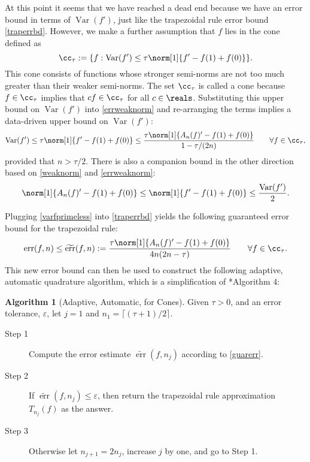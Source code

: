 \documentclass[]{amsart}
\DeclareMathOperator{\Var}{Var}
\DeclareMathOperator{\err}{err}
\newcommand{\terr}{\widetilde{\err}}
\theoremstyle{definition}
\newtheorem{algo}{Algorithm}
\theoremstyle{remark}
\begin{document}
At this point it seems that we have reached a dead end because we have an error bound in terms of $\Var(f')$, just like the trapezoidal rule error bound \eqref{traperrbd}.  However, we make a further assumption that $f$ lies in the cone defined as 
\begin{equation} \label{conedef}
\cc_{\tau} := \{f : \Var(f') \le \tau \norm[1]{f'-f(1)+f(0)} \}.
\end{equation}
This cone consists of functions whose stronger semi-norms are not too much greater than their weaker semi-norms.  The set $\cc_{\tau}$ is called a cone because $f \in \cc_{\tau}$ implies that $cf \in \cc_{\tau}$ for all $c \in \reals$.  Substituting this upper bound on $\Var(f')$ into \eqref{errweaknorm} and re-arranging the terms implies a data-driven upper bound on  $\Var(f')$:
\begin{equation} \label{varfprimeless}
\Var(f') \le \tau \norm[1]{f'-f(1)+f(0)}  \le \frac{\tau \norm[1]{A_n(f)'-f(1)+f(0)}}{1-\tau/(2n)} \qquad \forall f \in \cc_{\tau},
\end{equation}
provided that $n>\tau/2$.  There is also a companion bound in the other direction based on \eqref{weaknorm} and \eqref{errweaknorm}:
\begin{equation} \label{varfprimegreat}
\norm[1]{A_n(f)'-f(1)+f(0)} \le \norm[1]{f'-f(1)+f(0)} \le \frac{\Var(f')}{2}.
\end{equation}

Plugging \eqref{varfprimeless} into \eqref{traperrbd} yields the following guaranteed error bound for the trapezoidal rule:
\begin{equation} \label{guarerr}
\err(f,n) \le \terr(f,n) := \frac{\tau \norm[1]{A_n(f)'-f(1)+f(0)}} {4n(2n-\tau)} \qquad \forall f \in \cc_{\tau}.
\end{equation}
This new error bound can then be used to construct the following adaptive, automatic quadrature algorithm, which is a simplification of *{Algorithm 4}:

\begin{algo}[Adaptive, Automatic, for Cones] \label{newalgo} Given $\tau>0$, and an error tolerance, $\varepsilon$, let $j=1$ and $n_1=\lceil (\tau+1)/2 \rceil$.

\begin{description} 

\item[Step 1] Compute the error estimate $\terr(f,n_j)$ according to \eqref{guarerr}.

\item [Step 2] If $\terr(f,n_j) \le \varepsilon$, then return the trapezoidal rule approximation $T_{n_j}(f)$ as the answer.  

\item [Step 3] Otherwise let $n_{j+1}=2 n_j$, increase $j$ by one, and go to Step 1.

\end{description}
\end{algo}
\end{document}
